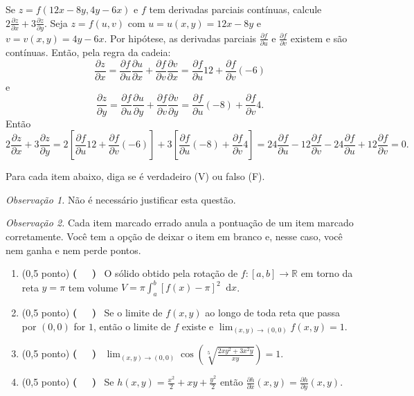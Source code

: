 \documentclass[12pt,a4paper]{article}
\newcommand*\diff{\mathop{}\!\mathrm{d}}
\begin{document}
\begin{ExerciseList}
\Exercise[title={2,0}] Se $z=f(12x-8y, 4y-6x)$ e $f$ tem derivadas parciais contínuas, calcule $2\frac{\partial z}{\partial x} + 3\frac{\partial z}{\partial y}$.
\Answer Seja $z=f(u, v)$ com $u = u(x,y) = 12x - 8y$ e $v = v(x,y) = 4y - 6x$. Por hipótese, as derivadas parciais $\frac{\partial f}{\partial u}$ e $\frac{\partial f}{\partial v}$ existem e são contínuas. Então, pela regra da cadeia:
\[
  \frac{\partial z}{\partial x}
  = \frac{\partial f}{\partial u} \frac{\partial u}{\partial x}
    + \frac{\partial f}{\partial v} \frac{\partial v}{\partial x}
  = \frac{\partial f}{\partial u} 12
    + \frac{\partial f}{\partial v} (-6)
\]
e
\[
  \frac{\partial z}{\partial y}
  = \frac{\partial f}{\partial u} \frac{\partial u}{\partial y}
    + \frac{\partial f}{\partial v} \frac{\partial v}{\partial y}
  = \frac{\partial f}{\partial u} (-8)
    + \frac{\partial f}{\partial v} 4.
\]
Então
\[
  2\frac{\partial z}{\partial x} + 3\frac{\partial z}{\partial y}
  = 2\left[\frac{\partial f}{\partial u} 12
    + \frac{\partial f}{\partial v} (-6)\right]
    + 3\left[\frac{\partial f}{\partial u} (-8)
    + \frac{\partial f}{\partial v} 4\right]
  = 24 \frac{\partial f}{\partial u}
    - 12 \frac{\partial f}{\partial v}
    - 24\frac{\partial f}{\partial u}
    + 12 \frac{\partial f}{\partial v}
  = 0.
\]


\Exercise[title={2,0}] Para cada item abaixo, diga se é verdadeiro (V) ou falso (F).

\emph{Observação 1.} Não é necessário justificar esta questão.

\emph{Observação 2.} Cada item marcado errado anula a pontuação de um item marcado corretamente. Você tem a opção de deixar o item em branco e, nesse caso, você nem ganha e nem perde pontos.


\begin{enumerate}
\item (0,5 ponto) {\bf ( \ \ )} \ O sólido obtido pela rotação de $f:[a,b]\to\mathbb{R}$ em torno da reta $y = \pi$ tem volume $V = \pi \int_a^b \left[f(x)-\pi\right]^2 \diff{x}$.
\item (0,5 ponto) {\bf ( \ \ )} \ Se o limite de $f(x,y)$ ao longo de toda reta que passa por $(0,0)$ for $1$, então o limite de $f$ existe e $\lim_{(x,y)\to(0,0)} f(x,y) = 1$.
\item (0,5 ponto) {\bf ( \ \ )} \ $\lim_{(x,y)\to(0,0)} \cos\left(\sqrt[5]{\frac{2xy^2+3x^2y}{xy}}\right) = 1$.
\item (0,5 ponto) {\bf ( \ \ )} \ Se $h(x, y) = \frac{x^2}{2} + xy + \frac{y^2}{2}$ então $\frac{\partial h}{\partial x}(x, y) = \frac{\partial h}{\partial y}(x, y)$.
\end{enumerate}


\end{ExerciseList}
\end{document}
